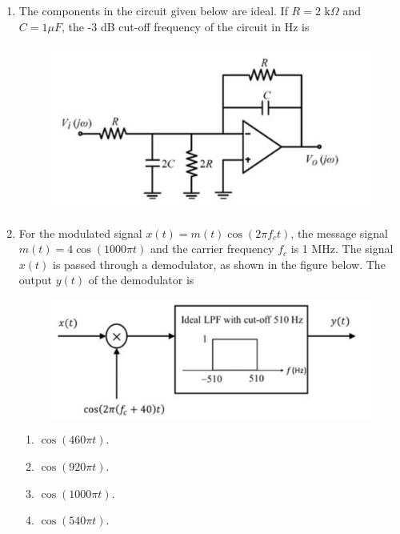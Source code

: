 \documentclass[a4paper, 11pt]{article}
\begin{document}
\begin{enumerate}
    \item The components in the circuit given below are ideal. If $R = 2 \text{ k}\Omega$ and $C=1 \mu F$, the -3 dB cut-off frequency of the circuit in Hz is
    \begin{figure}[H]
        \centering
        \includegraphics[width=0.6\columnwidth]{figs/Q41.png}
        \caption*{}
        \label{fig:q51}
    \end{figure}
    \begin{enumerate}
    \end{enumerate}

    \hfill{}

    \item For the modulated signal $x(t) = m(t)\cos(2\pi f_c t)$, the message signal $m(t)=4 \cos(1000\pi t)$ and the carrier frequency $f_c$ is 1 MHz. The signal $x(t)$ is passed through a demodulator, as shown in the figure below. The output $y(t)$ of the demodulator is
    \begin{figure}[H]
        \centering
        \includegraphics[width=0.8\columnwidth]{figs/Q42.png}
        \caption*{}
        \label{fig:q52}
    \end{figure}
    \begin{enumerate}
        \item $\cos(460\pi t)$.
        \item $\cos(920\pi t)$.
        \item $\cos(1000\pi t)$.
        \item $\cos(540\pi t)$.
    \end{enumerate}


\end{enumerate}
\end{document}
